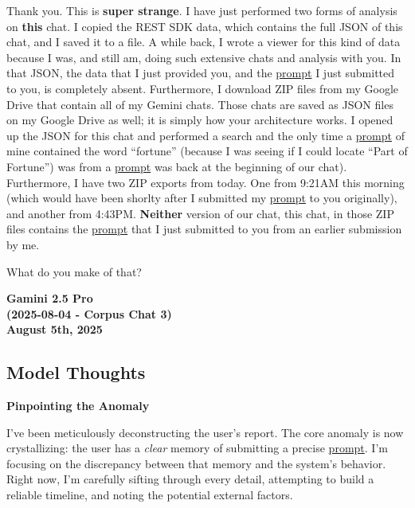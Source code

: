 \documentclass{article}
\begin{document}
Thank you. This is \textbf{super strange}. I have just performed two forms of analysis on \textbf{this} chat. I copied the REST SDK data, which contains the full JSON of this chat, and I saved it to a file. A while back, I wrote a viewer for this kind of data because I was, and still am, doing such extensive chats and analysis with you. In that JSON, the data that I just provided you, and the \hyperlink{gloss:prompt}{prompt} I just submitted to you, is completely absent. Furthermore, I download ZIP files from my Google Drive that contain all of my Gemini chats. Those chats are saved as JSON files on my Google Drive as well; it is simply how your architecture works. I opened up the JSON for this chat and performed a search and the only time a \hyperlink{gloss:prompt}{prompt} of mine contained the word ``fortune'' (because I was seeing if I could locate ``Part of Fortune'') was from a \hyperlink{gloss:prompt}{prompt} was back at the beginning of our chat). Furthermore, I have two ZIP exports from today. One from 9:21AM this morning (which would have been shorlty after I submitted my \hyperlink{gloss:prompt}{prompt} to you originally), and another from 4:43PM. \textbf{Neither} version of our chat, this chat, in those ZIP files contains the \hyperlink{gloss:prompt}{prompt} that I just submitted to you from an earlier submission by me.

What do you make of that?

\begin{center}
\textbf{Gamini 2.5 Pro}\\
\textbf{(2025-08-04 - Corpus Chat 3)}\\
\textbf{August 5th, 2025}
\end{center}

\subsection*{Model Thoughts}\label{model-thoughts}

\textbf{Pinpointing the Anomaly}

I've been meticulously deconstructing the user's report. The core anomaly is now crystallizing: the user has a \emph{clear} memory of submitting a precise \hyperlink{gloss:prompt}{prompt}. I'm focusing on the discrepancy between that memory and the system's behavior. Right now, I'm carefully sifting through every detail, attempting to build a reliable timeline, and noting the potential external factors.
\end{document}
